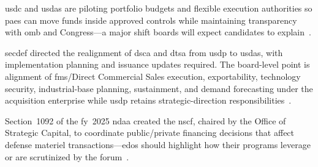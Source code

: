 \documentclass[../main.tex]{subfiles}
\begin{document}
\begin{description}[style=nextline,labelsep=0.5em,font=\bfseries]
  \item[\textbf{PPBE integration.}] \ac{usdc} and \ac{usdas} are piloting portfolio budgets and flexible execution authorities so \acp{pae} can move funds inside approved controls while maintaining transparency with \ac{omb} and Congress---a major shift boards will expect candidates to explain~\autocite{secwar-acq-transformation-2025}.
  \item[\textbf{Security cooperation realignment.}] \ac{secdef} directed the realignment of \ac{dsca} and \ac{dtsa} from \ac{usdp} to \ac{usdas}, with implementation planning and issuance updates required. The board-level point is alignment of \ac{fms}/Direct Commercial Sales execution, exportability, technology security, industrial-base planning, sustainment, and demand forecasting under the acquisition enterprise while \ac{usdp} retains strategic-direction responsibilities~\autocite{secwar-arms-transfer-2025}.
  \item[\textbf{National Security Capital Forum.}] Section~1092 of the \ac{fy}~2025 \ac{ndaa} created the \ac{nscf}, chaired by the Office of Strategic Capital, to coordinate public/private financing decisions that affect defense materiel transactions---\acp{edo} should highlight how their programs leverage or are scrutinized by the forum~\autocite{USC-10-149,secwar-nscf-2025}.
\end{description}
\end{document}
